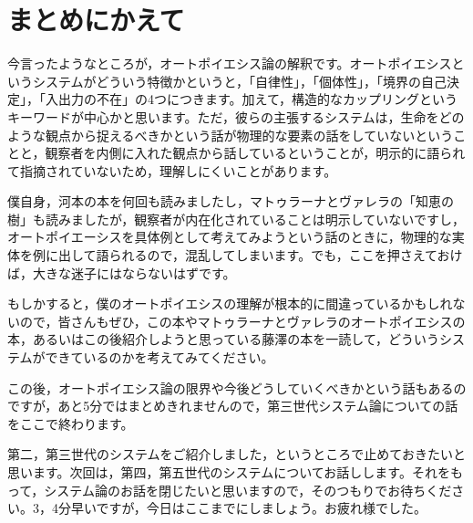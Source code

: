 \documentclass{ltjsbook}
\begin{document}
\section{まとめにかえて}

今言ったようなところが，オートポイエシス論の解釈です。オートポイエシスというシステムがどういう特徴かというと，「自律性」，「個体性」，「境界の自己決定」，「入出力の不在」の4つにつきます。加えて，構造的なカップリングというキーワードが中心かと思います。ただ，彼らの主張するシステムは，生命をどのような観点から捉えるべきかという話が物理的な要素の話をしていないということと，観察者を内側に入れた観点から話しているということが，明示的に語られて指摘されていないため，理解しにくいことがあります。

僕自身，河本の本を何回も読みましたし，マトゥラーナとヴァレラの「知恵の樹」\parencite{Chienoki}も読みましたが，観察者が内在化されていることは明示していないですし，オートポイエーシスを具体例として考えてみようという話のときに，物理的な実体を例に出して語られるので，混乱してしまいます。でも，ここを押さえておけば，大きな迷子にはならないはずです。

もしかすると，僕のオートポイエシスの理解が根本的に間違っているかもしれないので，皆さんもぜひ，この本やマトゥラーナとヴァレラのオートポイエシスの本，あるいはこの後紹介しようと思っている藤澤\parencite{fujisawaNetwork}の本を一読して，どういうシステムができているのかを考えてみてください。

この後，オートポイエシス論の限界や今後どうしていくべきかという話もあるのですが，あと5分ではまとめきれませんので，第三世代システム論についての話をここで終わります。

第二，第三世代のシステムをご紹介しました，というところで止めておきたいと思います。次回は，第四，第五世代のシステムについてお話しします。それをもって，システム論のお話を閉じたいと思いますので，そのつもりでお待ちください。3，4分早いですが，今日はここまでにしましょう。お疲れ様でした。
\end{document}
